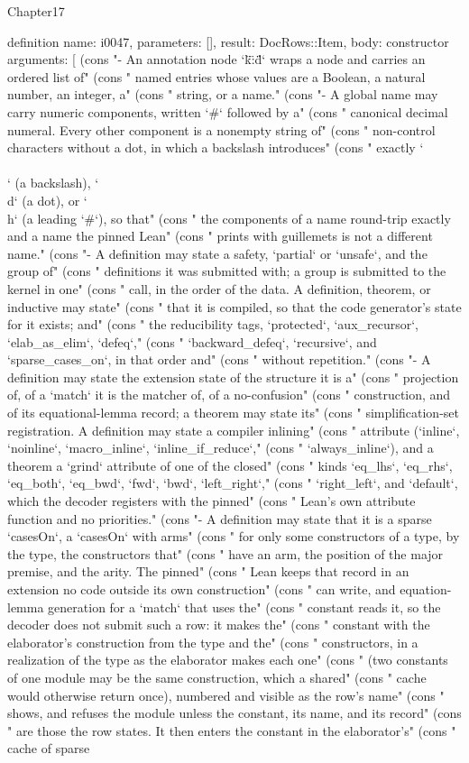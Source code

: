 \begin{lexlean}{Chapter17}
\begin{semanticmodule}
definition{
  name: i0047,
  parameters: [],
  result: DocRows::Item,
  body: constructor{
    arguments: [
      (cons "- An annotation node `{\"k\":\"d\"}` wraps a node and carries an ordered list of" (cons "  named entries whose values are a Boolean, a natural number, an integer, a" (cons "  string, or a name." (cons "- A global name may carry numeric components, written `#` followed by a" (cons "  canonical decimal numeral. Every other component is a nonempty string of" (cons "  non-control characters without a dot, in which a backslash introduces" (cons "  exactly `\\\\` (a backslash), `\\d` (a dot), or `\\h` (a leading `#`), so that" (cons "  the components of a name round-trip exactly and a name the pinned Lean" (cons "  prints with guillemets is not a different name." (cons "- A definition may state a safety, `partial` or `unsafe`, and the group of" (cons "  definitions it was submitted with; a group is submitted to the kernel in one" (cons "  call, in the order of the data. A definition, theorem, or inductive may state" (cons "  that it is compiled, so that the code generator's state for it exists; and" (cons "  the reducibility tags, `protected`, `aux_recursor`, `elab_as_elim`, `defeq`," (cons "  `backward_defeq`, `recursive`, and `sparse_cases_on`, in that order and" (cons "  without repetition." (cons "- A definition may state the extension state of the structure it is a" (cons "  projection of, of a `match` it is the matcher of, of a no-confusion" (cons "  construction, and of its equational-lemma record; a theorem may state its" (cons "  simplification-set registration. A definition may state a compiler inlining" (cons "  attribute (`inline`, `noinline`, `macro_inline`, `inline_if_reduce`," (cons "  `always_inline`), and a theorem a `grind` attribute of one of the closed" (cons "  kinds `eq_lhs`, `eq_rhs`, `eq_both`, `eq_bwd`, `fwd`, `bwd`, `left_right`," (cons "  `right_left`, and `default`, which the decoder registers with the pinned" (cons "  Lean's own attribute function and no priorities." (cons "- A definition may state that it is a sparse `casesOn`, a `casesOn` with arms" (cons "  for only some constructors of a type, by the type, the constructors that" (cons "  have an arm, the position of the major premise, and the arity. The pinned" (cons "  Lean keeps that record in an extension no code outside its own construction" (cons "  can write, and equation-lemma generation for a `match` that uses the" (cons "  constant reads it, so the decoder does not submit such a row: it makes the" (cons "  constant with the elaborator's construction from the type and the" (cons "  constructors, in a realization of the type as the elaborator makes each one" (cons "  (two constants of one module may be the same construction, which a shared" (cons "  cache would otherwise return once), numbered and visible as the row's name" (cons "  shows, and refuses the module unless the constant, its name, and its record" (cons "  are those the row states. It then enters the constant in the elaborator's" (cons "  cache of sparse }}
\end{semanticmodule}
\end{lexlean}
